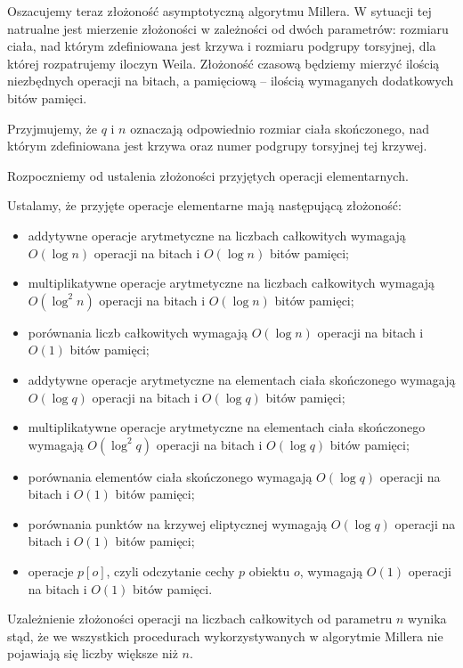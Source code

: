 \noindent
Oszacujemy teraz złożoność asymptotyczną algorytmu Millera.
W sytuacji tej natrualne jest mierzenie złożoności
w zależności od dwóch parametrów:
rozmiaru ciała, nad którym zdefiniowana jest krzywa
i rozmiaru podgrupy torsyjnej,
dla której rozpatrujemy iloczyn Weila.
Złożoność czasową będziemy mierzyć ilością niezbędnych operacji na bitach,
a pamięciową -- ilością wymaganych dodatkowych bitów pamięci.

\begin{remark}
Przyjmujemy, że $q$ i $n$ oznaczają odpowiednio
rozmiar ciała skończonego, nad którym zdefiniowana jest krzywa
oraz numer podgrupy torsyjnej tej krzywej.
\end{remark}

\noindent
Rozpoczniemy od ustalenia złożoności przyjętych operacji elementarnych.

\begin{remark}
Ustalamy, że przyjęte operacje elementarne mają następującą złożoność:
\begin{itemize}
\item
addytywne operacje arytmetyczne na liczbach całkowitych wymagają
$O(\log n)$ operacji na bitach i $O(\log n)$ bitów pamięci;
\item
multiplikatywne operacje arytmetyczne na liczbach całkowitych wymagają
$O(\log^2 n)$ operacji na bitach i $O(\log n)$ bitów pamięci;
\item
porównania liczb całkowitych wymagają
$O(\log n)$ operacji na bitach i $O(1)$ bitów pamięci;
\item
addytywne operacje arytmetyczne na elementach ciała skończonego wymagają
$O(\log q)$ operacji na bitach i $O(\log q)$ bitów pamięci;
\item
multiplikatywne operacje arytmetyczne na elementach ciała skończonego wymagają
$O(\log^2 q)$ operacji na bitach i $O(\log q)$ bitów pamięci;
\item
porównania elementów ciała skończonego wymagają
$O(\log q)$ operacji na bitach i $O(1)$ bitów pamięci;
\item
porównania punktów na krzywej eliptycznej wymagają
$O(\log q)$ operacji na bitach i $O(1)$ bitów pamięci;
\item
operacje $p[o]$, czyli odczytanie cechy $p$ obiektu $o$, wymagają
$O(1)$ operacji na bitach i $O(1)$ bitów pamięci.
\end{itemize}
\end{remark}

\begin{remark}
Uzależnienie złożoności operacji na liczbach całkowitych od parametru $n$
wynika stąd,
że we wszystkich procedurach wykorzystywanych w algorytmie Millera
nie pojawiają się liczby większe niż $n$.
\end{remark}

